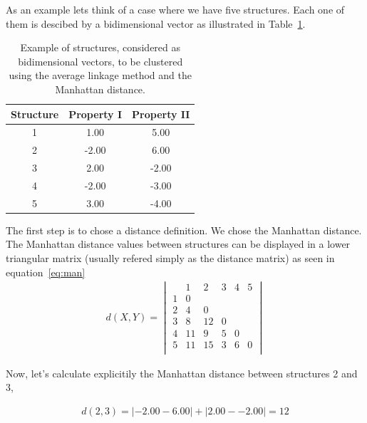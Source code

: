 As an example lets think of a case where we have five structures. Each
one of  them is descibed by  a bidimensional vector  as illustrated in
Table~\ref{tab:data}.
\begin{table}
\centering
\begin{tabular}[h]{|c|c|c|}
\hline
Structure & Property I & Property II\\
\hline\hline
1  &     1.00  &  5.00 \\
\hline
2  &    -2.00  & 6.00 \\
\hline
3  &      2.00  & -2.00 \\
\hline
4  &     -2.00  & -3.00 \\
\hline
5  &     3.00  &  -4.00 \\
\hline
\end{tabular}
\caption{Example of  structures, considered as  bidimensional vectors,
  to be clustered  using the average linkage method  and the Manhattan
  distance.}
\label{tab:data}
\end{table}

The  first step  is  to chose  a  distance definition.   We chose  the
Manhattan distance.  The  Manhattan distance values between structures
can be displayed in a  lower triangular matrix (usually refered simply
as the distance matrix) as seen in equation~\ref{eq:man}
\begin{gather} 
d(X, Y)=
\begin{vmatrix}
   & 1  &  2   & 3 & 4 & 5 \\
1  & 0  &      &   &   &   \\
2  & 4  &  0   &   &   &   \\
3  & 8  & 12   & 0 &   &   \\
4  & 11 &  9   & 5 & 0 &   \\
5  & 11 & 15   & 3 & 6 & 0 \\
\end{vmatrix}
\label{eq:man}
\end{gather}

Now,  let's  calculate  explicitily  the  Manhattan  distance  between
structures 2 and 3,

\begin{gather}
d(2, 3)= |-2.00 - 6.00| + |2.00 - -2.00| = 12
\end{gather}

